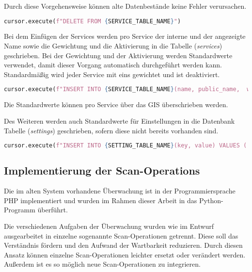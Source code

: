 Durch diese Vorgehensweise können alte Datenbestände keine Fehler verursachen.

\begin{lstlisting}[language=Python, frame=single, caption={Löschen der Services}, captionpos=b, label={lst:bigbrother-delete-service}]
cursor.execute(f"DELETE FROM {SERVICE_TABLE_NAME}")	
\end{lstlisting}

Bei dem Einfügen der Services werden pro Service der interne und der angezeigte Name sowie die Gewichtung und die Aktivierung in die Tabelle (\textit{services}) geschrieben. Bei der Gewichtung und der Aktivierung werden Standardwerte verwendet, damit dieser Vorgang automatisch durchgeführt werden kann. Standardmäßig wird jeder Service mit eins gewichtet und ist deaktiviert.

\begin{lstlisting}[language=Python, frame=single, caption={Einfügen eines Services}, captionpos=b, label={lst:bigbrother-create-service}]
cursor.execute(f"INSERT INTO {SERVICE_TABLE_NAME}(name, public_name,  weight,  active) VALUES ('{name}', '{public_name}', 1, FALSE);")
\end{lstlisting}

Die Standardwerte können pro Service über das GIS überschrieben werden.

Des Weiteren werden auch Standardwerte für Einstellungen in die Datenbank Tabelle (\textit{settings}) geschrieben, sofern diese nicht bereits vorhanden sind.

\begin{lstlisting}[language=Python, frame=single, caption={Einfügen einer Einstellung}, captionpos=b, label={lst:bigbrother-create-settings}]
cursor.execute(f"INSERT INTO {SETTING_TABLE_NAME}(key, value) VALUES ('{default_value[0]}', '{default_value[1]}') ON CONFLICT (key) DO NOTHING;")
\end{lstlisting}


\subsection{Implementierung der Scan-Operations}
Die im alten System vorhandene Überwachung ist in der Programmiersprache PHP implementiert und wurden im Rahmen dieser Arbeit in das Python-Programm überführt.

Die verschiedenen Aufgaben der Überwachung wurden wie im Entwurf ausgearbeitet in einzelne sogenannte Scan-Operationen getrennt. Diese soll das Verständnis fördern und den Aufwand der Wartbarkeit reduzieren. Durch diesen Ansatz können einzelne Scan-Operationen leichter ersetzt oder verändert werden. Außerdem ist es so möglich neue Scan-Operationen zu integrieren.

